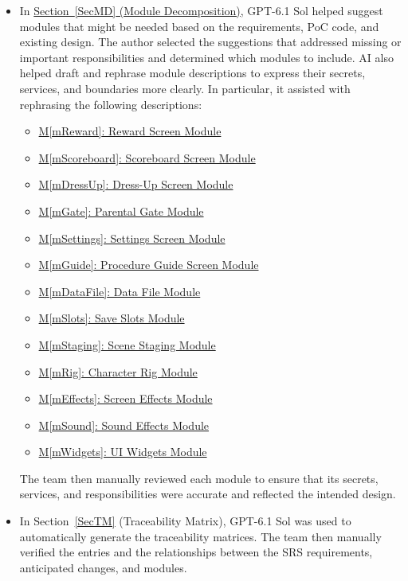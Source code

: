 \documentclass[10pt, titlepage]{article}
\newcommand{\mplainref}[1]{M\ref*{#1}}
\begin{document}
\begin{itemize}
    \item In \hyperref[SecMD]{Section~\ref*{SecMD} (Module Decomposition)},
    GPT-6.1 Sol helped suggest modules that might be needed based on the
    requirements, PoC code, and existing design. The author selected the
    suggestions that addressed missing or important responsibilities and
    determined which modules to include. AI also helped draft and rephrase
    module descriptions to express their secrets, services, and boundaries
    more clearly. In particular, it assisted with rephrasing the following
    descriptions:
    \begin{itemize}[itemsep=0pt, parsep=0pt, topsep=0.3em]
        \item \hyperref[md:mReward]{\mplainref{mReward}: Reward Screen Module}
        \item \hyperref[md:mScoreboard]{\mplainref{mScoreboard}: Scoreboard Screen Module}
        \item \hyperref[md:mDressUp]{\mplainref{mDressUp}: Dress-Up Screen Module}
        \item \hyperref[md:mGate]{\mplainref{mGate}: Parental Gate Module}
        \item \hyperref[md:mSettings]{\mplainref{mSettings}: Settings Screen Module}
        \item \hyperref[md:mGuide]{\mplainref{mGuide}: Procedure Guide Screen Module}
        \item \hyperref[md:mDataFile]{\mplainref{mDataFile}: Data File Module}
        \item \hyperref[md:mSlots]{\mplainref{mSlots}: Save Slots Module}
        \item \hyperref[md:mStaging]{\mplainref{mStaging}: Scene Staging Module}
        \item \hyperref[md:mRig]{\mplainref{mRig}: Character Rig Module}
        \item \hyperref[md:mEffects]{\mplainref{mEffects}: Screen Effects Module}
        \item \hyperref[md:mSound]{\mplainref{mSound}: Sound Effects Module}
        \item \hyperref[md:mWidgets]{\mplainref{mWidgets}: UI Widgets Module}
    \end{itemize}
    The team then manually reviewed each module to ensure that its secrets,
    services, and responsibilities were accurate and reflected the intended
    design.

    \item In Section~\ref{SecTM} (Traceability Matrix), GPT-6.1 Sol was used
    to automatically generate the traceability matrices. The team then
    manually verified the entries and the relationships between the SRS
    requirements, anticipated changes, and modules.


\end{itemize}
\end{document}

